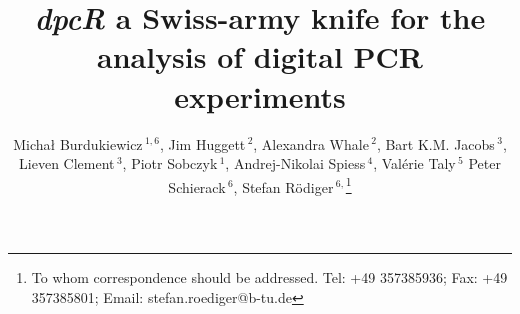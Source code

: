 \documentclass[a4,center,fleqn]{NAR}
\begin{document}
\title{\textit{dpcR} a Swiss-army knife for the analysis of digital PCR experiments}

\author{%
Micha\l{} Burdukiewicz\,$^{1,6}$,
Jim Huggett\,$^{2}$,
Alexandra Whale\,$^{2}$,
Bart K.M. Jacobs\,$^{3}$,
Lieven Clement\,$^{3}$,
Piotr Sobczyk\,$^{1}$,
Andrej-Nikolai Spiess\,$^{4}$,
Val\'{e}rie Taly\,$^{5}$
Peter Schierack\,$^{6}$,
Stefan R\"odiger\,$^{6,}$\footnote{To whom correspondence should be addressed.
Tel: +49 357385936; Fax: +49 357385801; Email: stefan.roediger@b-tu.de}}

\address{%
$^{1}$Department of Genomics, Faculty of Biotechnology, University of Wroc\l{}aw, Wroc\l{}aw, Poland
and
$^{2}$Molecular and Cell Biology Team, LGC, Teddington, United Kingdom
and
$^{3}$Department of Applied Mathematics, Computer Science and Statistics, Ghent University, Belgium
and
$^{4}$University Medical Center Hamburg-Eppendorf, Hamburg, Germany
and
$^{5}$Universit\'{e} Paris Sorbonne Cit\'{e}, Paris, France
and
$^{6}$Faculty of Natural Sciences, Brandenburg University of Technology Cottbus--Senftenberg, Gro\ss{}enhainer Str. 57, 01968, Senftenberg, Germany
}


\maketitle
\end{document}
